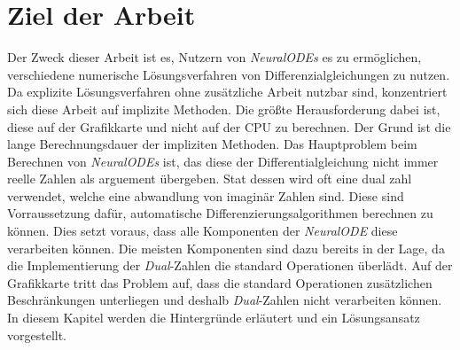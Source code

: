 
\section{Ziel der Arbeit} \label{sec:ziel_der_arbeit}

Der Zweck dieser Arbeit ist es, Nutzern von \textit{NeuralODEs} \cite{neuralode} es zu ermöglichen, 
verschiedene numerische Lösungsverfahren von Differenzialgleichungen zu nutzen.
Da explizite Lösungsverfahren ohne zusätzliche Arbeit nutzbar sind,
konzentriert sich diese Arbeit auf implizite Methoden.
Die größte Herausforderung dabei ist, 
diese auf der Grafikkarte und nicht auf der CPU zu berechnen.
Der Grund ist die lange Berechnungsdauer der impliziten Methoden.
Das Hauptproblem beim Berechnen von \textit{NeuralODEs} ist, das diese der Differentialgleichung nicht immer reelle Zahlen als arguement übergeben.
Stat dessen wird oft eine dual zahl verwendet, welche eine abwandlung von 
imaginär Zahlen sind.
Diese sind Vorraussetzung dafür, 
automatische Differenzierungsalgorithmen berechnen zu können.
Dies setzt voraus, dass alle Komponenten der \textit{NeuralODE}\cite{neuralode} diese verarbeiten können.
Die meisten Komponenten sind dazu bereits in der Lage, 
da die Implementierung der \textit{Dual}-Zahlen
die standard Operationen überlädt.
Auf der Grafikkarte tritt das Problem auf, dass die standard Operationen 
zusätzlichen Beschränkungen unterliegen 
und deshalb \textit{Dual}-Zahlen nicht verarbeiten können.
In diesem Kapitel werden die Hintergründe erläutert und ein Lösungsansatz vorgestellt.

